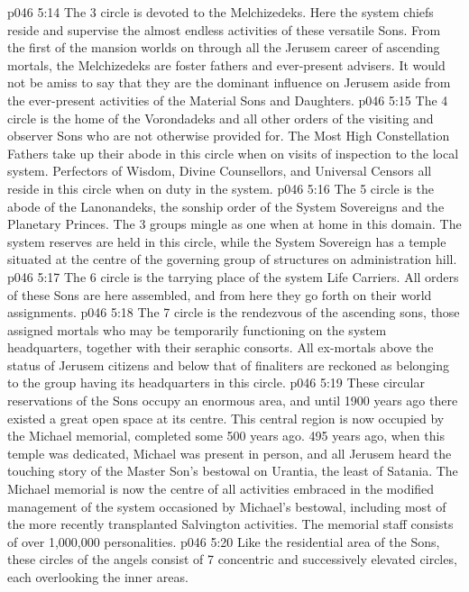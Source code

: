 \vs p046 5:14 The 3 circle is devoted to the Melchizedeks. Here the system chiefs reside and supervise the almost endless activities of these versatile Sons. From the first of the mansion worlds on through all the Jerusem career of ascending mortals, the Melchizedeks are foster fathers and ever\hyp{}present advisers. It would not be amiss to say that they are the dominant influence on Jerusem aside from the ever\hyp{}present activities of the Material Sons and Daughters.
\vs p046 5:15 The 4 circle is the home of the Vorondadeks and all other orders of the visiting and observer Sons who are not otherwise provided for. The Most High Constellation Fathers take up their abode in this circle when on visits of inspection to the local system. Perfectors of Wisdom, Divine Counsellors, and Universal Censors all reside in this circle when on duty in the system.
\vs p046 5:16 The 5 circle is the abode of the Lanonandeks, the sonship order of the System Sovereigns and the Planetary Princes. The 3 groups mingle as one when at home in this domain. The system reserves are held in this circle, while the System Sovereign has a temple situated at the centre of the governing group of structures on administration hill.
\vs p046 5:17 The 6 circle is the tarrying place of the system Life Carriers. All orders of these Sons are here assembled, and from here they go forth on their world assignments.
\vs p046 5:18 The 7 circle is the rendezvous of the ascending sons, those assigned mortals who may be temporarily functioning on the system headquarters, together with their seraphic consorts. All ex\hyp{}mortals above the status of Jerusem citizens and below that of finaliters are reckoned as belonging to the group having its headquarters in this circle.
\vs p046 5:19 These circular reservations of the Sons occupy an enormous area, and until 1900 years ago there existed a great open space at its centre. This central region is now occupied by the Michael memorial, completed some 500 years ago. 495 years ago, when this temple was dedicated, Michael was present in person, and all Jerusem heard the touching story of the Master Son’s bestowal on Urantia, the least of Satania. The Michael memorial is now the centre of all activities embraced in the modified management of the system occasioned by Michael’s bestowal, including most of the more recently transplanted Salvington activities. The memorial staff consists of over 1,000,000 personalities.
\vs p046 5:20 \bibnobreakspace {} Like the residential area of the Sons, these circles of the angels consist of 7 concentric and successively elevated circles, each overlooking the inner areas.
